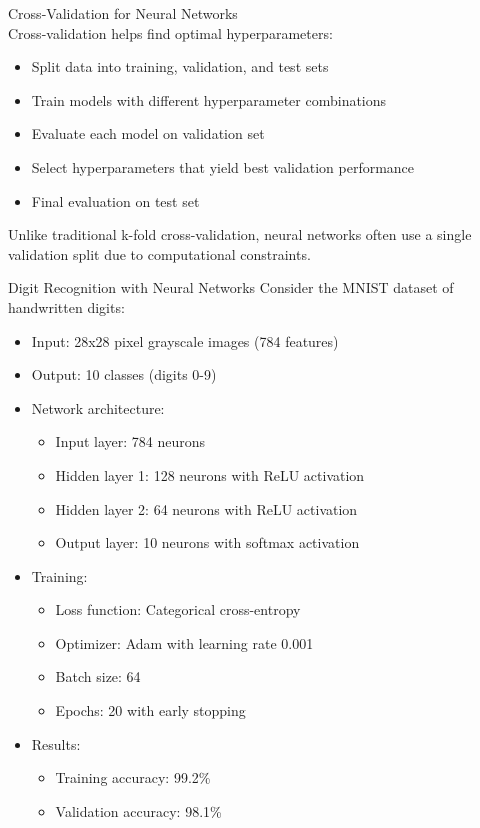 
\begin{concept}{Cross-Validation for Neural Networks}\\
Cross-validation helps find optimal hyperparameters:
\begin{itemize}
    \item Split data into training, validation, and test sets
    \item Train models with different hyperparameter combinations
    \item Evaluate each model on validation set
    \item Select hyperparameters that yield best validation performance
    \item Final evaluation on test set
\end{itemize}
Unlike traditional k-fold cross-validation, neural networks often use a single validation split due to computational constraints.
\end{concept}

\begin{example}{Digit Recognition with Neural Networks}
Consider the MNIST dataset of handwritten digits:
\begin{itemize}
    \item Input: 28x28 pixel grayscale images (784 features)
    \item Output: 10 classes (digits 0-9)
    \item Network architecture:
    \begin{itemize}
        \item Input layer: 784 neurons
        \item Hidden layer 1: 128 neurons with ReLU activation
        \item Hidden layer 2: 64 neurons with ReLU activation
        \item Output layer: 10 neurons with softmax activation
    \end{itemize}
    \item Training:
    \begin{itemize}
        \item Loss function: Categorical cross-entropy
        \item Optimizer: Adam with learning rate 0.001
        \item Batch size: 64
        \item Epochs: 20 with early stopping
    \end{itemize}
    \item Results:
    \begin{itemize}
        \item Training accuracy: 99.2\%
        \item Validation accuracy: 98.1\%
    \end{itemize}
\end{itemize}
\end{example}

